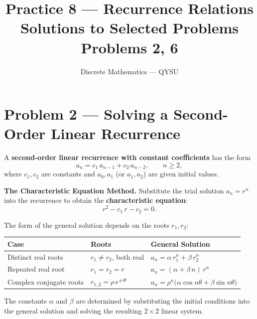 \documentclass[12pt, a4paper]{article}
\title{\textbf{Practice 8 --- Recurrence Relations}\\[4pt]
       \large Solutions to Selected Problems\\[2pt]
       \normalsize Problems 2, 6}
\author{Discrete Mathematics --- QYSU}
\date{}
\begin{document}
\maketitle
\tableofcontents
\newpage

\section{Problem 2 --- Solving a Second-Order Linear Recurrence}

\begin{theorybox}
A \textbf{second-order linear recurrence with constant coefficients} has the form
\[
  a_n = c_1\, a_{n-1} + c_2\, a_{n-2}, \qquad n \ge 2,
\]
where $c_1, c_2$ are constants and $a_0, a_1$ (or $a_1, a_2$) are given initial values.

\medskip
\textbf{The Characteristic Equation Method.}\;
Substitute the trial solution $a_n = r^n$ into the recurrence to obtain the
\textbf{characteristic equation}:
\[
  r^2 - c_1\, r - c_2 = 0.
\]

The form of the general solution depends on the roots $r_1, r_2$:

\medskip
\begin{center}
\renewcommand{\arraystretch}{1.5}
\begin{tabular}{lll}
\toprule
\textbf{Case} & \textbf{Roots} & \textbf{General Solution} \\
\midrule
Distinct real roots & $r_1 \neq r_2$, both real
  & $a_n = \alpha\, r_1^n + \beta\, r_2^n$ \\
Repeated real root & $r_1 = r_2 = r$
  & $a_n = (\alpha + \beta\, n)\, r^n$ \\
Complex conjugate roots & $r_{1,2} = \rho\, e^{\pm i\theta}$
  & $a_n = \rho^n\bigl(\alpha \cos n\theta + \beta \sin n\theta\bigr)$ \\
\bottomrule
\end{tabular}
\end{center}

\medskip
The constants $\alpha$ and $\beta$ are determined by substituting the initial conditions
into the general solution and solving the resulting $2 \times 2$ linear system.


\end{theorybox}
\end{document}
